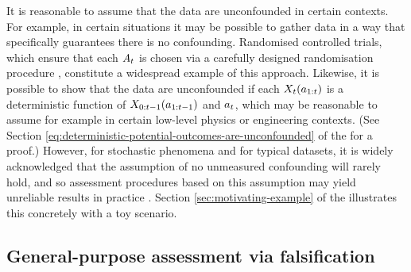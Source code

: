 It is reasonable to assume that the data are unconfounded in certain contexts.
For example, in certain situations it may be possible to gather data in a way that specifically guarantees there is no confounding.
Randomised controlled trials, which ensure that each $A_t$ is chosen via a carefully designed randomisation procedure \citep{lavori2004dynamic,murphy2005experimental}, constitute a widespread example of this approach.
Likewise, it is possible to show that the data are unconfounded if each $X_t(a_{1:t})$ is a deterministic function of $X_{0:t-1}(a_{1:t-1})$ and $a_{t}$, which may be reasonable to assume for example in certain low-level physics or engineering contexts.
(See Section \ref{eq:deterministic-potential-outcomes-are-unconfounded} of the \AppendixName for a proof.)
However, for stochastic phenomena and for typical datasets, it is widely acknowledged that the assumption of no unmeasured confounding will rarely hold, and so assessment procedures based on this assumption may yield unreliable results in practice \citep{murphy2003optimal,tsiatis2019dynamic}.
Section \ref{sec:motivating-example} of the \AppendixName illustrates this concretely with a toy scenario.



\subsection{General-purpose assessment via falsification}

